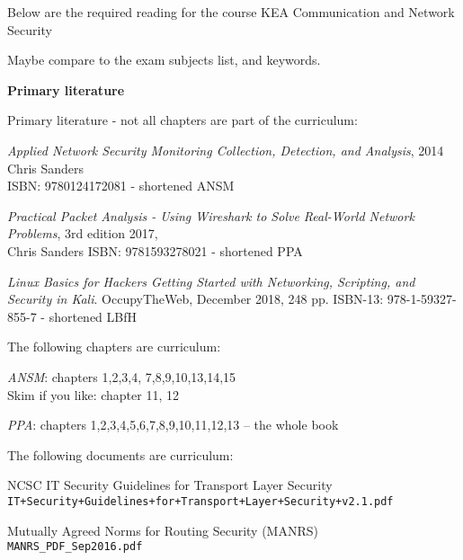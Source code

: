 \documentclass[a4paper,11pt,notitlepage,landscape]{report}
\begin{document}
{}


\normal

Below are the required reading for the course KEA Communication and Network Security \the\year

Maybe compare to the exam subjects list, and keywords.


{\bf Primary literature}

Primary literature - not all chapters are part of the curriculum:
\begin{list2}
\item \emph{Applied Network Security Monitoring Collection, Detection, and Analysis}, 2014 Chris Sanders \\
ISBN: 9780124172081 - shortened ANSM
\item \emph{Practical Packet Analysis - Using Wireshark to Solve Real-World Network Problems}, 3rd edition 2017, \\
Chris Sanders ISBN: 9781593278021 - shortened PPA
\item \emph{Linux Basics for Hackers Getting Started with Networking, Scripting, and Security in Kali}. OccupyTheWeb, December 2018, 248 pp. ISBN-13: 978-1-59327-855-7 - shortened LBfH
\end{list2}


The following chapters are curriculum:

\begin{list2}
\item \emph{ANSM}: chapters 1,2,3,4, 7,8,9,10,13,14,15\\
Skim if you like: chapter 11, 12
\item \emph{PPA}: chapters 1,2,3,4,5,6,7,8,9,10,11,12,13 -- the whole book

\end{list2}

The following documents are curriculum:
\begin{list2}
\item NCSC IT Security Guidelines for Transport Layer Security\\
\verb_IT+Security+Guidelines+for+Transport+Layer+Security+v2.1.pdf_
\item Mutually Agreed Norms for Routing Security (MANRS)\\
\verb+MANRS_PDF_Sep2016.pdf+
\end{list2}
\end{document}
